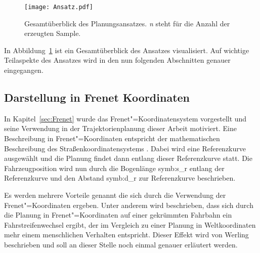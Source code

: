 \begin{figure}[!htbp]
    \centering
    \texttt{[image: Ansatz.pdf]}
    \caption[Planungsansatz]{Gesamt\"uberblick des Planungsansatzes. \textit{n} steht f\"ur die Anzahl der erzeugten Sample.}
    \label{fig:Ansatz}
 \end{figure}

In Abbildung~\ref{fig:Ansatz} ist ein Gesamt\"uberblick des Ansatzes visualisiert.
Auf wichtige Teilaspekte des Ansatzes wird in den nun folgenden Abschnitten genauer eingegangen.

\FloatBarrier


\subsection{Darstellung in Frenet Koordinaten}
\label{sec:FrenetBesch}
In Kapitel~\ref{sec:Frenet} wurde das Frenet"=Koordinatensystem vorgestellt und seine Verwendung in der Trajektorienplanung dieser Arbeit motiviert.
Eine Beschreibung in Frenet"=Koordinaten entspricht der mathematischen Beschreibung des Stra{\ss}enkoordinatensystems \cite{Rathgeber2016}.
Dabei wird eine Referenzkurve ausgew\"ahlt und die Planung findet dann entlang dieser Referenzkurve statt.
Die Fahrzeugposition wird nun durch die Bogenl\"ange \gls{symb:s_r} entlang der Referenzkurve und den Abstand \gls{symb:d_r} zur Referenzkurve beschrieben.

Es werden mehrere Vorteile genannt die sich durch die Verwendung der Frenet"=Koordinaten ergeben.
Unter anderem wird beschrieben, dass sich durch die Planung in Frenet"=Koordinaten auf einer gekr\"ummten Fahrbahn ein Fahrstreifenwechsel ergibt, der im Vergleich zu einer Planung in Weltkoordinaten mehr einem menschlichen Verhalten entspricht.
Dieser Effekt wird von Werling \cite{Werling2011} beschrieben und soll an dieser Stelle noch einmal genauer erl\"autert werden.

